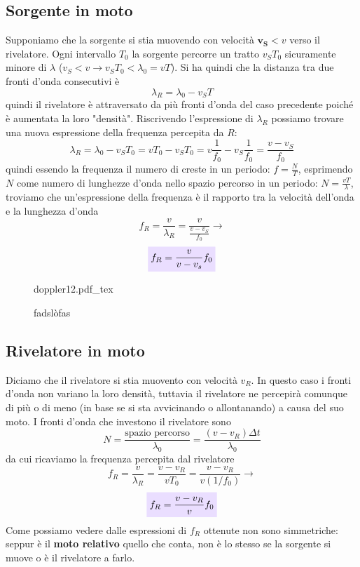 \documentclass[x11names]{report}
\newcommand{\incfig}[1]{%
	\def\svgwidth{\columnwidth}
	{#1.pdf_tex}
}
\newcommand{\viola}[1]{\colorbox{yred}{$\displaystyle #1$}}
\begin{document}
	\subsection{Sorgente in moto}
	Supponiamo che la sorgente si stia muovendo con velocità \(\boldsymbol{v_S} < v\) verso il rivelatore. Ogni intervallo \(T_0\) la sorgente percorre un tratto \(v_ST_0\) sicuramente minore di \(\lambda\) (\(v_S < v \to v_ST_0 < \lambda_0= vT\)). Si ha quindi che la distanza tra due fronti d'onda consecutivi è
	\[ 
	\lambda_R = \lambda_0 - v_ST
	\]
	quindi il rivelatore è attraversato da più fronti d'onda del caso precedente poiché è aumentata la loro "densità". Riscrivendo l'espressione di \(\lambda_R\) possiamo trovare una nuova espressione della frequenza percepita da \(R\): 
	\[ 
	\lambda_R = \lambda_0 - v_ST_0 = vT_0 - v_ST_0 = v\frac{1}{f_0} - v_S\frac{1}{f_0} = \frac{v - v_S}{f_0}
	\]
	quindi essendo la frequenza il numero di creste in un periodo: \(f =\frac{N}{T}\), esprimendo \(N\) come numero di lunghezze d'onda nello spazio percorso in un periodo: \(N = \frac{vT}{\lambda}\), troviamo che un'espressione della frequenza è il rapporto tra la velocità dell'onda e la lunghezza d'onda 
	\[ 
	f_R = \frac{v}{\lambda_R} = \frac{v}{\frac{v - v_S}{f_0}} \to
	\]
	\begin{equation}
		\viola{f_R = \frac{v}{v - v_s}f_0}
	\end{equation}
	
	\begin{figure}[ht]
		\centering
		\incfig{doppler12}
		\caption{fadslòfas}
		\label{fig:fasdkllfas}
	\end{figure}
	
	\subsection{Rivelatore in moto}
	Diciamo che il rivelatore si stia muovento con velocità \(v_R\). In questo caso i fronti d'onda non variano la loro densità, tuttavia il rivelatore ne percepirà comunque di più o di meno (in base se si sta avvicinando o allontanando) a causa del suo moto. I fronti d'onda che investono il rivelatore sono
	\[ 
	N = \frac{\text{spazio percorso}}{\lambda_0} = \frac{(v - v_R)\Delta t}{\lambda_0}
	\]
	da cui ricaviamo la frequenza percepita dal rivelatore
	\[ 
	f_R = \frac{v}{\lambda_R} = \frac{v - v_R}{vT_0} = \frac{v - v_R}{v(1/f_0)} \to
	\]
	\begin{equation}
	\viola{f_R = \frac{v - v_R}{v}f_0}
	\end{equation}
	Come possiamo vedere dalle espressioni di \(f_R\) ottenute non sono simmetriche: seppur è il \textbf{moto relativo} quello che conta, non è lo stesso se la sorgente si muove o è il rivelatore a farlo.
	
\end{document}
